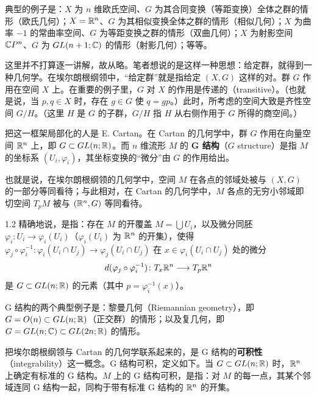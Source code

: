 
典型的例子是：$X$ 为 $n$ 维欧氏空间、$G$ 为其合同变换（等距变换）全体之群的情形（欧氏几何）；$X=\mathbb{R}^n$、$G$ 为其相似变换全体之群的情形（相似几何）；$X$ 为曲率 $-1$ 的常曲率空间、$G$ 为等距变换之群的情形（双曲几何）；$X$ 为射影空间 $\mathbb{C}P^n$、$G$ 为 $GL(n+1;\mathbb{C})$ 的情形（射影几何）；等等。



这里并不打算逐一讲解，故从略。笔者想说的是这样一种思想：给定群，就得到一种几何学。在埃尔朗根纲领中，“给定群”就是指给定 $(X,G)$ 这样的对。群 $G$ 作用在空间 $X$ 上。在重要的例子里，$G$ 对 $X$ 的作用是传递的（transitive）。（也就是说，当 $p,q\in X$ 时，存在 $g\in G$ 使 $q=gp$。）此时，所考虑的空间大致是齐性空间 $G/H$。（这里 $H$ 是 $G$ 的子群，$G/H$ 指 $H$ 从右侧作用于 $G$ 所得的商空间。）

把这一框架局部化的人是 E. Cartan。在 Cartan 的几何学中，群 $G$ 作用在向量空间 $\mathbb{R}^n$ 上，即 $G\subset GL(n;\mathbb{R})$。而 $n$ 维流形 $M$ 的 \textbf{G 结构}（$G$ structure）是指 $M$ 的坐标系 $(U_i,\varphi_i)$，其坐标变换的“微分”由 $G$ 的作用给出。

也就是说，在埃尔朗根纲领的几何学中，空间 $M$ 在各点的邻域处被与 $(X,G)$ 的一部分等同看待；与此相对，在 Cartan 的几何学中，$M$ 各点的无穷小邻域即切空间 $T_pM$ 被与 $(\mathbb{R}^n,G)$ 等同看待。

\begin{remark}{1.2}
  精确地说，是指：存在 $M$ 的开覆盖 $M=\bigcup U_i$，以及微分同胚 $\varphi_i\colon U_i\to\varphi_i(U_i)$（$\varphi_i(U_i)$ 为 $\mathbb{R}^n$ 的开集），使得 $\varphi_j\circ\varphi_i^{-1}\colon\varphi_i(U_i\cap U_j)\to\varphi_j(U_i\cap U_j)$ 在 $x\in\varphi_i(U_i\cap U_j)$ 处的微分
  \[
    d(\varphi_j\circ\varphi_i^{-1})\colon T_x\mathbb{R}^n \longrightarrow T_p\mathbb{R}^n
  \]
  是 $G\subset GL(n;\mathbb{R})$ 的元素（其中 $p=\varphi_i^{-1}(x)$）。
\end{remark}

G 结构的两个典型例子是：黎曼几何（Riemannian geometry），即 $G=O(n)\subset GL(n;\mathbb{R})$（正交群）的情形；以及复几何，即 $G=GL(n;\mathbb{C})\subset GL(2n;\mathbb{R})$ 的情形。

把埃尔朗根纲领与 Cartan 的几何学联系起来的，是 G 结构的\textbf{可积性}（integrability）这一概念。G 结构可积，定义如下。当 $G\subset GL(n;\mathbb{R})$ 时，$\mathbb{R}^n$ 上确定有标准的 G 结构。$M$ 上的 G 结构可积，是指：对 $M$ 的每一点，其某个邻域连同 G 结构一起，同构于带有标准 G 结构的 $\mathbb{R}^n$ 的开集。

